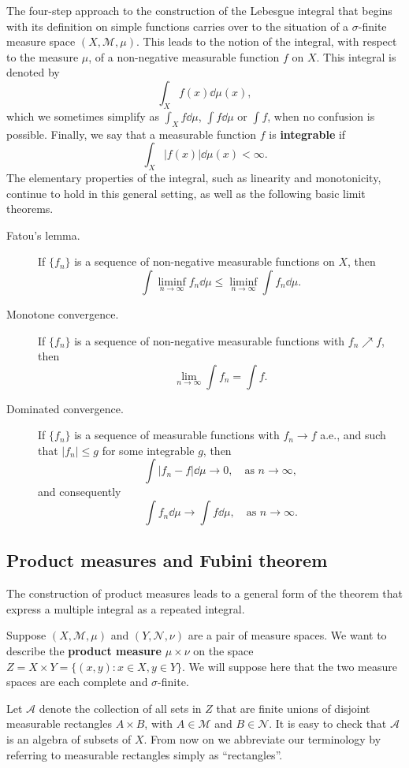 The four-step approach to the construction of the Lebesgue integral that begins with its definition on simple functions carries over to the situation of a $\sigma$-finite measure space $(X,\mathcal M,\mu)$.
This leads to the notion of the integral, with respect to the measure $\mu$, 
of a non-negative measurable function $f$ on $X$. This integral is denoted by 
\[
\int_X f(x)\dd\mu(x),
\]
which we sometimes simplify as $\int_Xf\dd\mu$, $\int f\dd\mu$ or $\int f$, 
when no confusion is possible.
Finally, we say that a measurable function $f$ is \textbf{integrable} if 
\[
\int_X|f(x)|\dd\mu(x) < \infty.
\]
The elementary properties of the integral, such as linearity and monotonicity, 
continue to hold in this general setting, as well as the following basic limit theorems.
\begin{description}
  \item[Fatou's lemma.] If $\{f_n\}$ is a sequence of non-negative measurable functions on $X$, then 
  \[
  \int \liminf_{n\to\infty}f_n\dd\mu\leq\liminf_{n\to\infty}\int f_n\dd\mu.
  \]
  \item[Monotone convergence.] If $\{f_n\}$ is a sequence of non-negative measurable functions with $f_n\nearrow f$, then 
  \[
  \lim_{n\to\infty}\int f_n = \int f.
  \]
  \item[Dominated convergence.] If $\{f_n\}$ is a sequence of measurable functions with $f_n\to f$ a.e., 
  and such that $|f_n|\leq g$ for some integrable $g$, then 
  \[
  \int |f_n-f|\dd\mu\to0,\quad\text{as }n\to\infty,
  \]
  and consequently 
  \[
  \int f_n\dd\mu\to\int f\dd\mu,\quad\text{as }n\to\infty.
  \] 
\end{description}

\subsection{Product measures and Fubini theorem}

The construction of product measures leads to a general form of the theorem that express a multiple integral as a repeated integral.

Suppose $(X,\mathcal M, \mu)$ and $(Y,\mathcal N, \nu)$ are a pair of measure spaces.
We want to describe the \textbf{product measure} $\mu\times\nu$ on the space 
$Z = X\times Y = \{(x,y): x\in X, y\in Y\}$.
We will suppose here that the two measure spaces are each complete and $\sigma$-finite.

Let $\mathcal A$ denote the collection of all sets in $Z$ that are finite unions of disjoint measurable rectangles $A\times B$, with $A\in\mathcal M$ and $B\in\mathcal N$.
It is easy to check that $\mathcal A$ is an algebra of subsets of $X$.
From now on we abbreviate our terminology by referring to measurable rectangles simply as ``rectangles''.

